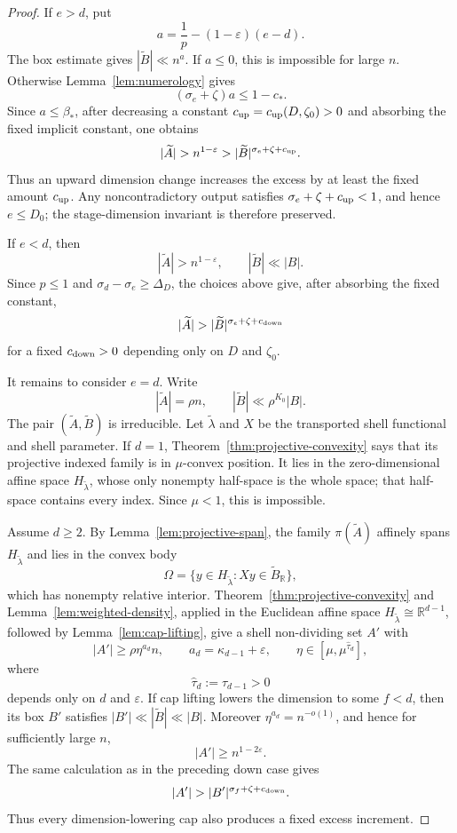 \documentclass[11pt,reqno]{amsart}
\theoremstyle{definition}
\theoremstyle{remark}
\newcommand{\R}{\mathbb R}
\newcommand{\eps}{\varepsilon}
\begin{document}
\begin{proof}
If $e>d$, put
\[
 a=\frac1p-(1-\eps)(e-d).
\]
The box estimate gives $|\widetilde B|\ll n^a$.  If $a\le0$, this is
impossible for large $n$.  Otherwise Lemma~\ref{lem:numerology}
gives
\[
 (\sigma_e+\zeta)a\le1-c_*.
\]
Since $a\le\beta_*$, after decreasing a constant
$c_{\rm up}=c_{\rm up}(D,\zeta_0)>0$ and absorbing the fixed implicit
constant, one obtains
\[
 |\widetilde A|>n^{1-\eps}
 >|\widetilde B|^{\sigma_e+\zeta+c_{\rm up}}.
\]
Thus an upward dimension change increases the excess by at least the fixed
amount $c_{\rm up}$.  Any noncontradictory output satisfies
$\sigma_e+\zeta+c_{\rm up}<1$, and hence $e\le D_0$; the stage-dimension
invariant is therefore preserved.

If $e<d$, then
\[
 |\widetilde A|>n^{1-\eps},
 \qquad
 |\widetilde B|\ll|B|.
\]
Since $p\le1$ and $\sigma_d-\sigma_e\ge\Delta_D$, the choices above give,
after absorbing the fixed constant,
\[
 |\widetilde A|
 >|\widetilde B|^{\sigma_e+\zeta+c_{\rm down}}
\]
for a fixed $c_{\rm down}>0$ depending only on $D$ and $\zeta_0$.

It remains to consider $e=d$.  Write
\[
 |\widetilde A|=\rho n,
 \qquad
 |\widetilde B|\ll\rho^{K_0}|B|.
\]
The pair $(\widetilde A,\widetilde B)$ is irreducible.  Let
$\widetilde\lambda$ and $X$ be the transported shell functional and shell
parameter.  If $d=1$, Theorem~\ref{thm:projective-convexity} says that its
projective indexed family is in $\mu$-convex position.  It lies in the
zero-dimensional affine space $H_{\widetilde\lambda}$, whose only nonempty
half-space is the whole space; that half-space contains every index.  Since
$\mu<1$, this is impossible.

Assume $d\ge2$.  By Lemma~\ref{lem:projective-span}, the
family $\pi(\widetilde A)$ affinely spans $H_{\widetilde\lambda}$ and lies
in the convex body
\[
 \Omega=\{y\in H_{\widetilde\lambda}:Xy\in\widetilde B_{\R}\},
\]
which has nonempty relative interior.  Theorem~\ref{thm:projective-convexity}
and Lemma~\ref{lem:weighted-density}, applied in the Euclidean affine space
$H_{\widetilde\lambda}\cong\R^{d-1}$, followed by
Lemma~\ref{lem:cap-lifting}, give a shell non-dividing set $A'$ with
\[
 |A'|\ge\rho\eta^{a_d}n,
 \qquad
 a_d=\kappa_{d-1}+\eps,
 \qquad
 \eta\in[\mu,\mu^{\widehat\tau_d}],
\]
where
\[
 \widehat\tau_d:=\tau_{d-1}>0
\]
depends only on $d$ and $\eps$.  If cap lifting lowers the
dimension to some $f<d$, then its box $B'$ satisfies
$|B'|\ll|\widetilde B|\ll|B|$.  Moreover
$\eta^{a_d}=n^{-o(1)}$, and hence for sufficiently large $n$,
\[
 |A'|\ge n^{1-2\eps}.
\]
The same calculation as in the preceding down case gives
\[
 |A'|>|B'|^{\sigma_f+\zeta+c_{\rm down}}.
\]
Thus every dimension-lowering cap also produces a fixed excess increment.


\end{proof}
\end{document}
